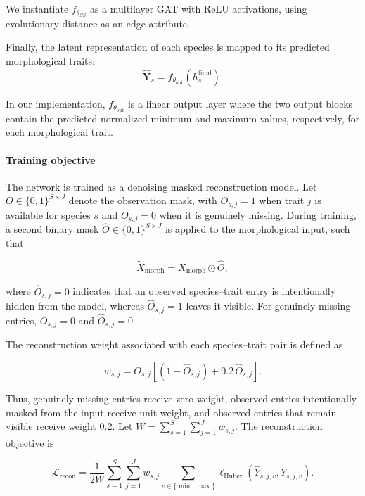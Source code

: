 \documentclass[preprint,12pt,authoryear]{elsarticle}
\begin{document}
We instantiate
\(f_{\theta_{SS}}\)
as a multilayer GAT with ReLU activations, using evolutionary distance as an edge attribute.


Finally, the latent representation of each species is mapped to its predicted morphological traits:
\begin{equation}
    \hat{\mathbf{Y}}_s
    =
    f_{\theta_{\mathrm{out}}}
    \left(h_s^{\mathrm{final}}\right).
\end{equation}

In our implementation, \(f_{\theta_{\mathrm{out}}}\) is a linear output layer where the two output blocks contain the predicted normalized minimum and maximum values, respectively, for each morphological trait.

\paragraph{Training objective}

The network is trained as a denoising masked reconstruction model. Let \(O\in\{0,1\}^{S\times J}\) denote the observation mask, with \(O_{s,j}=1\) when trait \(j\) is available for species \(s\) and \(O_{s,j}=0\) when it is genuinely missing. During training, a second binary mask \(\hat O\in\{0,1\}^{S\times J}\) is applied to the morphological input, such that

\[
    \widetilde X_{\mathrm{morph}}
    =
    X_{\mathrm{morph}}\odot \hat O ,
\]

where \(\hat O_{s,j}=0\) indicates that an observed species--trait entry is intentionally hidden from the model, whereas \(\hat O_{s,j}=1\) leaves it visible. For genuinely missing entries, \(O_{s,j}=0\) and \(\hat O_{s,j}=0\).

The reconstruction weight associated with each species--trait pair is defined as

\begin{equation}
    w_{s,j}
    =
    O_{s,j}
    \left[
        (1-\hat O_{s,j})
        +
        0.2\,\hat O_{s,j}
    \right].
\end{equation}

Thus, genuinely missing entries receive zero weight, observed entries intentionally masked from the input receive unit weight, and observed entries that remain visible receive weight \(0.2\). Let $W=\sum_{s=1}^{S}\sum_{j=1}^{J}w_{s,j}$. The reconstruction objective is

\begin{equation}
    \mathcal{L}_{\mathrm{recon}}
    =
    \frac{1}{2W}
    \sum_{s=1}^{S}\sum_{j=1}^{J}w_{s,j}
    \sum_{v\in\{\min,\max\}}
    \ell_{\mathrm{Huber}}\!\left(
        \hat{Y}_{s,j,v},Y_{s,j,v}
    \right).
    \label{eq:loss}
\end{equation}
\end{document}
